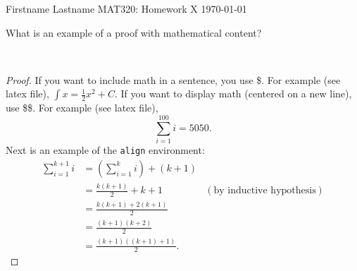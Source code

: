 \documentclass[12pt]{article}
\newenvironment{ex}[2][Exercise]{\begin{trivlist}
\item[\hskip \labelsep {\bfseries #1}\hskip \labelsep {\bfseries #2.}]}{\end{trivlist}}
\newenvironment{sol}[1][Solution]{\begin{trivlist}
\item[\hskip \labelsep {\bfseries #1:}]}{\end{trivlist}}
\begin{document}

\noindent Firstname Lastname \hfill {\Large MAT320: Homework X} \hfill \today

\begin{ex}{3.2} 
What is an example of a proof with mathematical content? 
\end{ex}

\begin{sol}\

\begin{proof}
If you want to include math in a sentence, you use \$. For example (see latex file), $\int x = \frac{1}{2}x^2 + C$.  If you want to display math (centered on a new line), use \$\$. For example (see latex file), $$\sum_{i=1}^{100} i = 5050.$$ Next is an example of the \texttt{align} environment:
\begin{align*}
\sum_{i=1}^{k+1}i & = \left(\sum_{i=1}^{k}i\right) +(k+1)\\ 
& = \frac{k(k+1)}{2}+k+1 & (\text{by inductive hypothesis})\\
& = \frac{k(k+1)+2(k+1)}{2}\\
& = \frac{(k+1)(k+2)}{2}\\
& = \frac{(k+1)((k+1)+1)}{2}.
\end{align*}
\end{proof}
\end{sol}

\end{document}
